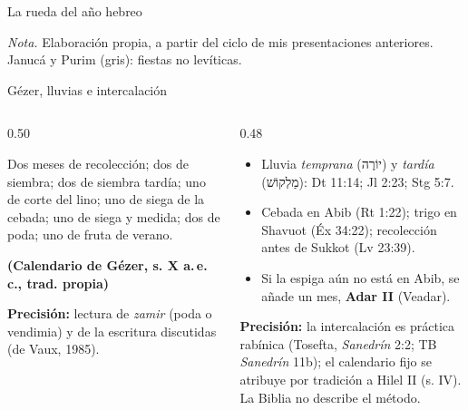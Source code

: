 \documentclass[hyperref={bookmarks=false},aspectratio=169]{beamer}
\newcommand{\heb}[1]{\mbox{\foreignlanguage{hebrew}{#1}}}
\newcommand{\fuente}[1]{\par\hfill{\upshape\bfseries\footnotesize\textcolor{tierraroja}{#1}}}
\newcommand{\destacar}[1]{\textbf{\textcolor{tierraroja}{#1}}}
\newcommand{\precision}[1]{{\footnotesize\color{sepia}\textbf{Precisión:} #1}}
\begin{document}
\begin{frame}{La rueda del año hebreo}
{}\par
{\fontsize{5}{6}\selectfont\color{sepia}\textit{Nota.} Elaboración propia, a partir del ciclo de mis presentaciones anteriores. Janucá y Purim (gris): fiestas no levíticas.}
\end{frame}


\begin{frame}{Gézer, lluvias e intercalación}
\begin{columns}[t,onlytextwidth]
\begin{column}{0.50\textwidth}
\begin{cita}Dos meses de recolección; dos de siembra; dos de siembra tardía; uno de corte del lino; uno de siega de la cebada; uno de siega y medida; dos de poda; uno de fruta de verano.\fuente{(Calendario de Gézer, s. X a.\,e.\,c., trad. propia)}\end{cita}
\precision{lectura de \emph{zamir} (poda o vendimia) y de la escritura discutidas (de Vaux, 1985).}
\end{column}
\begin{column}{0.48\textwidth}\scriptsize
\begin{itemize}
\item Lluvia \emph{temprana} (\heb{יוֹרֶה}) y \emph{tardía} (\heb{מַלְקוֹשׁ}): Dt 11:14; Jl 2:23; Stg 5:7.
\item Cebada en Abib (Rt 1:22); trigo en Shavuot (Éx 34:22); recolección antes de Sukkot (Lv 23:39).
\item Si la espiga aún no está en Abib, se añade un mes, \destacar{Adar II} (Veadar).
\end{itemize}
\precision{la intercalación es práctica rabínica (Tosefta, \emph{Sanedrín} 2:2; TB \emph{Sanedrín} 11b); el calendario fijo se atribuye por tradición a Hilel II (s. IV). La Biblia no describe el método.}
\end{column}
\end{columns}
\end{frame}
\end{document}
